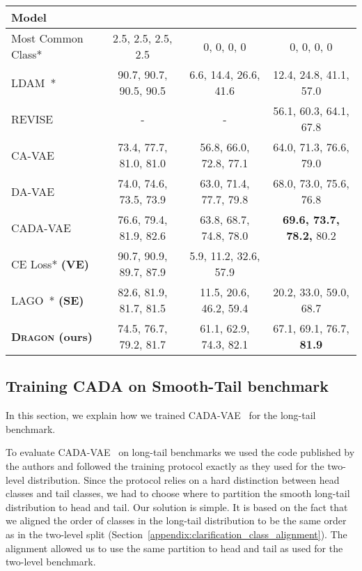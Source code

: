 \documentclass[10pt,twocolumn,letterpaper]{article}
\newcommand{\secref}[1]{Section~\ref{#1}}
\newcommand{\DRAGON}{\textsc{Dragon}}
\newcommand{\SmoothTail}{Smooth-Tail}
\begin{document}
\begin{table*}
\bigskip
\begin{subtable}{\textwidth}
\centering
   \begin{tabular}{l|c|c|c}
   Model & 
    \textbf{} & \textbf{} &
    \textbf{} \\
  \midrule
    Most Common Class* &
    2.5, 2.5, 2.5, 2.5 & 0, 0, 0, 0 & 0, 0, 0, 0  \\
    \hline
    LDAM~\cite{cao2019learning}* &
    90.7, 90.7, 90.5, 90.5 & 6.6, 14.4, 26.6, 41.6 & 12.4, 24.8, 41.1, 57.0   \\
    \hline
    REVISE~\cite{REVISE} &
    - & - & 56.1, 60.3, 64.1, 67.8  \\
    CA-VAE~\cite{Schnfeld2019GeneralizedZL}&
    73.4, 77.7, 81.0, 81.0 & 56.8, 66.0, 72.8, 77.1 & 64.0, 71.3, 76.6, 79.0 \\
    DA-VAE~\cite{Schnfeld2019GeneralizedZL} &
    74.0, 74.6, 73.5, 73.9 & 63.0, 71.4, 77.7, 79.8 & 68.0, 73.0, 75.6, 76.8 \\
    CADA-VAE~\cite{Schnfeld2019GeneralizedZL} &
    76.6, 79.4, 81.9, 82.6 & 63.8, 68.7, 74.8, 78.0 & \textbf{69.6, 73.7, 78.2,} 80.2  \\
    \hline
    CE Loss* \textbf{(VE)} &
    90.7, 90.9, 89.7, 87.9 & 5.9, 11.2, 32.6, 57.9 & \\
    LAGO~\cite{LAGO}* \textbf{(SE)} &
    82.6, 81.9, 81.7, 81.5 & 11.5, 20.6, 46.2, 59.4 & 20.2, 33.0, 59.0, 68.7   \\
    \textbf{\DRAGON{} (ours)} &
    74.5, 76.7, 79.2, 81.7 & 61.1, 62.9, 74.3, 82.1 & 67.1, 69.1, 76.7, \textbf{81.9}   \\
\bottomrule
\end{tabular}
\caption{Two-Level AWA}
   \label{tab:sub_third}
\end{subtable}
\caption{Comparing  \DRAGON{} with SoTA GFSL models and baselines with increasing number of few-shot training samples on the CUB, SUN and AWA datasets. We report per-class ,  and  . Each cell represents 1-shot,2-shot,5-shot and 10-shot accuracies}
   \label{tab:three_tables}
\end{table*}


\subsection{Training CADA on \SmoothTail{} benchmark}
\label{appendix:training-cada}
In this section, we explain how we trained CADA-VAE~\cite{Schnfeld2019GeneralizedZL} for the long-tail benchmark.

To evaluate CADA-VAE~\cite{Schnfeld2019GeneralizedZL} on long-tail benchmarks we used the code published by the authors and followed the training protocol exactly as they used for the two-level distribution. Since the protocol relies on a hard distinction between head classes and tail classes, we had to choose where to partition the smooth long-tail distribution to head and tail. Our solution is simple. It is based on the fact that we aligned the order of classes in the long-tail distribution to be the same order as in the two-level split (\secref{appendix:clarification_class_alignment}). The alignment allowed us to use the same partition to head and tail as used for the two-level benchmark.
\end{document}
